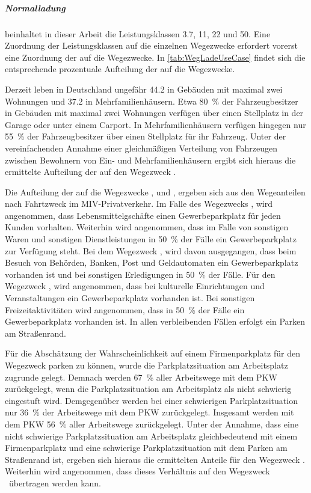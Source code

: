 \subparagraph{Normalladung} beinhaltet in dieser Arbeit die Leistungsklassen \SI{3.7}{\kw}, \SI{11}{\kw}, \SI{22}{\kw} und \SI{50}{\kw}.
Eine Zuordnung der Leistungsklassen auf die einzelnen Wegezwecke erfordert vorerst eine Zuordnung der \UCs auf die Wegezwecke.
In \autoref{tab:WegLadeUseCase} findet sich die entsprechende prozentuale Aufteilung der \UCs auf die Wegezwecke.



Derzeit leben in Deutschland ungefähr \SI{44.2}{\MioMen} in Gebäuden mit maximal zwei Wohnungen und \SI{37.2}{\MioMen} in Mehrfamilienhäusern.
Etwa \SI{80}{\percent} der Fahrzeugbesitzer in Gebäuden mit maximal zwei Wohnungen verfügen über einen Stellplatz in der Garage oder unter einem Carport.
In Mehrfamilienhäusern verfügen hingegen nur \SI{55}{\percent} der Fahrzeugbesitzer über einen Stellplatz für ihr Fahrzeug. \cite{dena2020}
Unter der vereinfachenden Annahme einer gleichmäßigen Verteilung von Fahrzeugen zwischen Bewohnern von Ein- und Mehrfamilienhäusern ergibt sich hieraus die ermittelte Aufteilung der \UCs auf den Wegezweck \nHdot.\medskip

Die Aufteilung der \UCs auf die Wegezwecke \Einkaufdot, \Erledigung und \Freizeitdot, ergeben sich aus den Wegeanteilen nach Fahrtzweck im \gls{MIV}-Privatverkehr. \cite{Rikus2015}
Im Falle des Wegezwecks \Einkaufdot, wird angenommen, dass Lebensmittelgschäfte einen Gewerbeparkplatz für jeden Kunden vorhalten.
Weiterhin wird angenommen, dass im Falle von sonstigen Waren und sonstigen Dienstleistungen in \SI{50}{\percent} der Fälle ein Gewerbeparkplatz zur Verfügung steht.
Bei dem Wegezweck \Erledigungdot, wird davon ausgegangen, dass beim Besuch von Behörden, Banken, Post und Geldautomaten ein Gewerbeparkplatz vorhanden ist und bei sonstigen Erledigungen in \SI{50}{\percent} der Fälle.
Für den Wegezweck \Freizeitdot, wird angenommen, dass bei kulturelle Einrichtungen und Veranstaltungen ein Gewerbeparkplatz vorhanden ist.
Bei sonstigen Freizeitaktivitäten wird angenommen, dass in \SI{50}{\percent} der Fälle ein Gewerbeparkplatz vorhanden ist.
In allen verbleibenden Fällen erfolgt ein Parken am Straßenrand.\medskip

Für die Abschätzung der Wahrscheinlichkeit auf einem Firmenparkplatz für den Wegezweck \Arbeit parken zu können, wurde die Parkplatzsituation am Arbeitsplatz zugrunde gelegt.
Demnach werden \SI{67}{\percent} aller Arbeitswege mit dem \gls{PKW} zurückgelegt, wenn die Parkplatzsituation am Arbeitsplatz als nicht schwierig eingestuft wird.
Demgegenüber werden bei einer schwierigen Parkplatzsituation nur \SI{36}{\percent} der Arbeitswege mit dem \gls{PKW} zurückgelegt.
Insgesamt werden mit dem \gls{PKW} \SI{56}{\percent} aller Arbeitswege zurückgelegt. \cite{Ecke2020}
Unter der Annahme, dass eine nicht schwierige Parkplatzsituation am Arbeitsplatz gleichbedeutend mit einem Firmenparkplatz und eine schwierige Parkplatzsituation mit dem Parken am Straßenrand ist, ergeben sich hieraus die ermittelten Anteile für den Wegezweck \Arbeitdot.
Weiterhin wird angenommen, dass dieses Verhältnis auf den Wegezweck \Ausbildung~übertragen werden kann.\medskip


